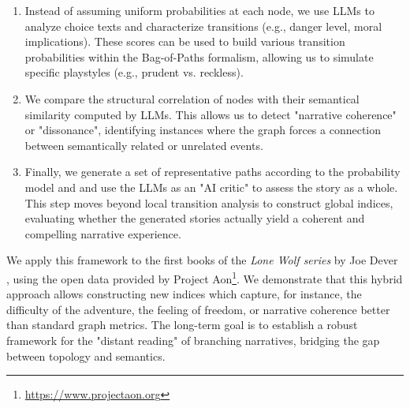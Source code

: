 \documentclass[11pt]{article}
\begin{document}
\begin{enumerate}
	\item Instead of assuming uniform probabilities at each node, we use LLMs to analyze choice texts and characterize transitions (e.g., danger level, moral implications). These scores can be used to build various transition probabilities within the Bag-of-Paths formalism, allowing us to simulate specific playstyles (e.g., prudent vs. reckless).
	
	\item We compare the structural correlation of nodes with their semantical similarity computed by LLMs. This allows us to detect "narrative coherence" or "dissonance", identifying instances where the graph forces a connection between semantically related or unrelated events.
	
	\item Finally, we generate a set of representative paths according to the probability model and and use the LLMs as an "AI critic" to assess the story as a whole. This step moves beyond local transition analysis to construct global indices, evaluating whether the generated stories actually yield a coherent and compelling narrative experience.
\end{enumerate}

We apply this framework to the first books of the \emph{Lone Wolf series} by Joe Dever \cite{dever_flight_1991}, using the open data provided by Project Aon\footnote{\url{https://www.projectaon.org}}. We demonstrate that this hybrid approach allows constructing new indices which capture, for instance, the difficulty of the adventure, the feeling of freedom, or narrative coherence better than standard graph metrics. The long-term goal is to establish a robust framework for the "distant reading" of branching narratives, bridging the gap between topology and semantics.

%


\end{document}

